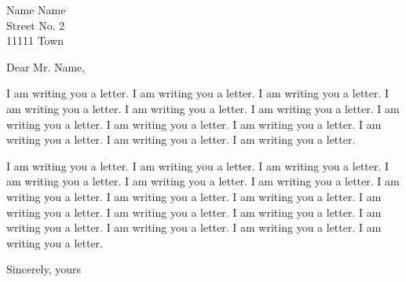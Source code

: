 \documentclass[addressstd,a4paper,10pt]{dinbrief}
\newif\ifpdf
\begin{document}
\ifpdf
	\DeclareGraphicsExtensions{.pdf,.jpg,.png}
\else
\fi


\begin{letter}{Name Name\\ %
               Street No. 2\\[\medskipamount]
               11111 Town}



\subject{\bf Subject of the letter}

\opening{Dear Mr. Name,}

I am writing you a letter. I am writing you a letter. I am writing you a letter. I am writing you a letter. I am writing you a letter. I am writing you a letter. I am writing you a letter. I am writing you a letter. I am writing you a letter. I am writing you a letter. I am writing you a letter. I am writing you a letter.

I am writing you a letter. I am writing you a letter. I am writing you a letter. I am writing you a letter. I am writing you a letter. I am writing you a letter. I am writing you a letter. I am writing you a letter. I am writing you a letter. I am writing you a letter. I am writing you a letter. I am writing you a letter. I am writing you a letter. I am writing you a letter. I am writing you a letter. I am writing you a letter.

\closing{Sincerely, yours}



\end{letter}


\end{document}
